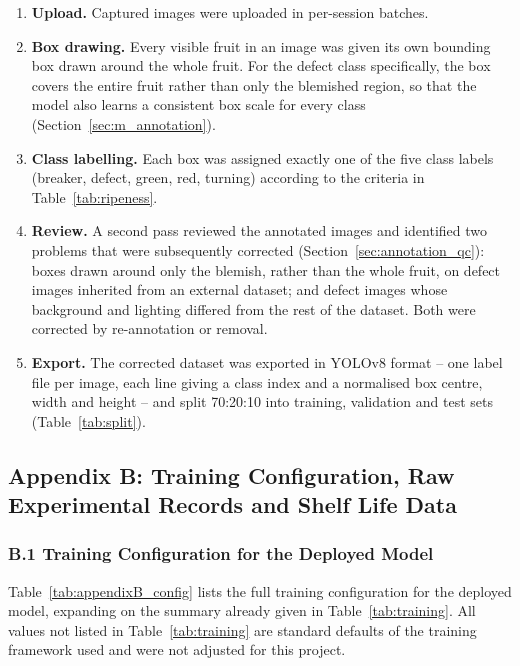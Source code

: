 \begin{enumerate}
    \item \textbf{Upload.} Captured images were uploaded in per-session batches.
    \item \textbf{Box drawing.} Every visible fruit in an image was given its own bounding box drawn around the whole fruit. For the defect class specifically, the box covers the entire fruit rather than only the blemished region, so that the model also learns a consistent box scale for every class (Section~\ref{sec:m_annotation}).
    \item \textbf{Class labelling.} Each box was assigned exactly one of the five class labels (breaker, defect, green, red, turning) according to the criteria in Table~\ref{tab:ripeness}.
    \item \textbf{Review.} A second pass reviewed the annotated images and identified two problems that were subsequently corrected (Section~\ref{sec:annotation_qc}): boxes drawn around only the blemish, rather than the whole fruit, on defect images inherited from an external dataset; and defect images whose background and lighting differed from the rest of the dataset. Both were corrected by re-annotation or removal.
    \item \textbf{Export.} The corrected dataset was exported in YOLOv8 format -- one label file per image, each line giving a class index and a normalised box centre, width and height -- and split 70:20:10 into training, validation and test sets (Table~\ref{tab:split}).
\end{enumerate}

\label{app:B}
\subsection*{Appendix B: Training Configuration, Raw Experimental Records and Shelf Life Data}

\subsubsection*{B.1 Training Configuration for the Deployed Model}

Table~\ref{tab:appendixB_config} lists the full training configuration for the deployed model, expanding on the summary already given in Table~\ref{tab:training}. All values not listed in Table~\ref{tab:training} are standard defaults of the training framework used and were not adjusted for this project.

